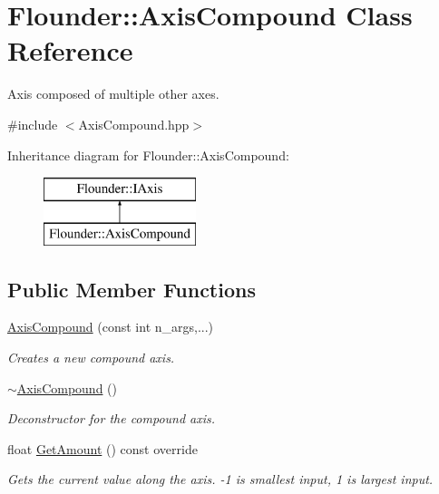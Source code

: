 \hypertarget{class_flounder_1_1_axis_compound}{}\section{Flounder\+:\+:Axis\+Compound Class Reference}
\label{class_flounder_1_1_axis_compound}


Axis composed of multiple other axes.  




{\ttfamily \#include $<$Axis\+Compound.\+hpp$>$}

Inheritance diagram for Flounder\+:\+:Axis\+Compound\+:\begin{figure}[H]
\begin{center}
\leavevmode
\includegraphics[height=2.000000cm]{class_flounder_1_1_axis_compound}
\end{center}
\end{figure}
\subsection*{Public Member Functions}
\begin{DoxyCompactItemize}
\item 
\hyperlink{class_flounder_1_1_axis_compound_a7532a7e6de5bf935a28d37e05a4c6cdc}{Axis\+Compound} (const int n\+\_\+args,...)
\begin{DoxyCompactList}\small\item\em Creates a new compound axis. \end{DoxyCompactList}\item 
\hyperlink{class_flounder_1_1_axis_compound_afc537fe10c02e1e2bd8d8d53d57ec26a}{$\sim$\+Axis\+Compound} ()
\begin{DoxyCompactList}\small\item\em Deconstructor for the compound axis. \end{DoxyCompactList}\item 
float \hyperlink{class_flounder_1_1_axis_compound_a9ce2015af606b6add617423ab21edc28}{Get\+Amount} () const override
\begin{DoxyCompactList}\small\item\em Gets the current value along the axis. -\/1 is smallest input, 1 is largest input. \end{DoxyCompactList}\end{DoxyCompactItemize}
